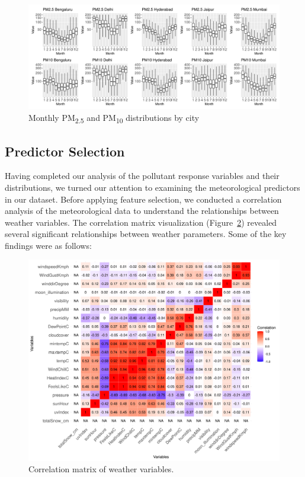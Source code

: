\documentclass[twoside,11pt]{article}
\begin{document}
\begin{figure}[H]
  \centering
  \includegraphics[width=\textwidth]{assets/seasonal-trends.png}
  \caption{Monthly PM\textsubscript{2.5} and PM\textsubscript{10} distributions by city}
  \label{fig:seasonal_trends}
\end{figure}

\subsection{Predictor Selection}

Having completed our analysis of the pollutant response variables and their distributions, we turned our attention to examining the meteorological predictors in our dataset. Before applying feature selection, we conducted a correlation analysis of the meteorological data to understand the relationships between weather variables. The correlation matrix visualization (Figure~\ref{fig:correlation_matrix}) revealed several significant relationships between weather parameters. Some of the key findings were as follows:

\begin{figure}[H]
  \centering
  \includegraphics[width=\textwidth]{assets/feature-correlation-matrix.png}
  \caption{Correlation matrix of weather variables.}
  \label{fig:correlation_matrix}
\end{figure}
\end{document}

